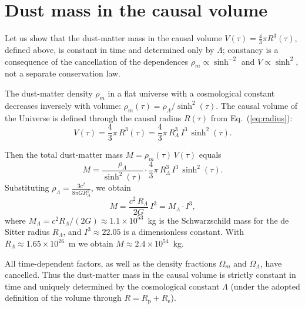 \documentclass[10pt,a4paper]{article}
\begin{document}
\section{Dust mass in the causal volume}
\label{sec:mass}

Let us show that the dust-matter mass in the causal volume $V(\tau)=\tfrac{4}{3}\pi R^3(\tau)$, defined above, is constant in time and determined only by $\Lambda$; constancy is a consequence of the cancellation of the dependences $\rho_m\propto\sinh^{-2}$ and $V\propto\sinh^{2}$, not a separate conservation law.

The dust-matter density $\rho_m$ in a flat universe with a cosmological constant decreases inversely with volume: $\rho_m(\tau) = \rho_\Lambda / \sinh^2(\tau)$. The causal volume of the Universe is defined through the causal radius $R(\tau)$ from Eq.~(\ref{eq:radius}):
\begin{equation}
V(\tau) = \frac{4}{3}\pi\,R^3(\tau) = \frac{4}{3}\pi\,R_\Lambda^3\,I^3\,\sinh^2(\tau).
\end{equation}

Then the total dust-matter mass $M = \rho_m(\tau)\,V(\tau)$ equals
\begin{equation}
M = \frac{\rho_\Lambda}{\sinh^2(\tau)} \cdot \frac{4}{3}\pi\,R_\Lambda^3\,I^3\,\sinh^2(\tau).
\end{equation}
Substituting $\rho_\Lambda = \frac{3 c^2}{8\pi G R_\Lambda^2}$, we obtain
\begin{equation}
\boxed{M = \frac{c^2\,R_\Lambda}{2G}\,I^3 = M_\Lambda \cdot I^3,}
\end{equation}
where $M_\Lambda = c^2 R_\Lambda / (2G) \approx 1.1 \times 10^{53}$~kg is the Schwarzschild mass for the de Sitter radius $R_\Lambda$, and $I^3 \approx 22.05$ is a dimensionless constant. With $R_\Lambda \approx 1.65 \times 10^{26}$~m we obtain $M \approx 2.4 \times 10^{54}$~kg.

All time-dependent factors, as well as the density fractions $\Omega_m$ and $\Omega_\Lambda$, have cancelled. Thus the dust-matter mass in the causal volume is strictly constant in time and uniquely determined by the cosmological constant $\Lambda$ (under the adopted definition of the volume through $R=R_{\mathrm{p}}+R_{\mathrm{e}}$).
\end{document}
